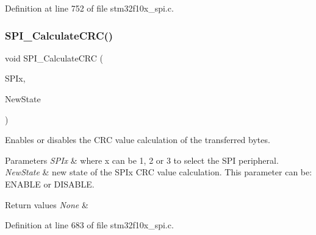 Definition at line 752 of file stm32f10x\+\_\+spi.\+c.

\mbox{\label{group___s_p_i___exported___functions_ga64f7276d119e6cb58afc100f8832adb0}} 
\subsubsection{\texorpdfstring{S\+P\+I\+\_\+\+Calculate\+C\+R\+C()}{SPI\_CalculateCRC()}}
{\footnotesize\ttfamily void S\+P\+I\+\_\+\+Calculate\+C\+RC (\begin{DoxyParamCaption}\item[{\hyperlink{struct_s_p_i___type_def}{S\+P\+I\+\_\+\+Type\+Def} $\ast$}]{S\+P\+Ix,  }\item[{\hyperlink{group___exported__types_gac9a7e9a35d2513ec15c3b537aaa4fba1}{Functional\+State}}]{New\+State }\end{DoxyParamCaption})}



Enables or disables the C\+RC value calculation of the transferred bytes. 


\begin{DoxyParams}{Parameters}
{\em S\+P\+Ix} & where x can be 1, 2 or 3 to select the S\+PI peripheral. \\
\hline
{\em New\+State} & new state of the S\+P\+Ix C\+RC value calculation. This parameter can be\+: E\+N\+A\+B\+LE or D\+I\+S\+A\+B\+LE. \\
\hline
\end{DoxyParams}

\begin{DoxyRetVals}{Return values}
{\em None} & \\
\hline
\end{DoxyRetVals}


Definition at line 683 of file stm32f10x\+\_\+spi.\+c.

\mbox{\label{group___s_p_i___exported___functions_gaa31357879a65ee1ed7223f3b9114dcf3}} 
